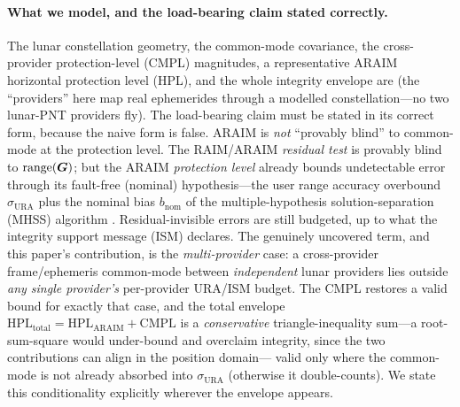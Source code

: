 \paragraph{What we model, and the load-bearing claim stated correctly.}
The lunar constellation geometry, the common-mode covariance, the cross-provider
protection-level (CMPL) magnitudes, a representative ARAIM horizontal protection level
(HPL), and the whole integrity envelope are \Modelled{} (the ``providers'' here map
real ephemerides through a modelled constellation---no two lunar-PNT providers fly).
The load-bearing claim must be stated in its correct form, because the naive form is
false. ARAIM is \emph{not} ``provably blind'' to common-mode at the protection level.
The RAIM/ARAIM \emph{residual test} is provably blind to $\operatorname{range}(\bm{G})$; but the ARAIM
\emph{protection level} already bounds undetectable error through its fault-free
(nominal) hypothesis---the user range accuracy overbound $\sigma_{\mathrm{URA}}$ plus
the nominal bias $b_{\mathrm{nom}}$ of the multiple-hypothesis solution-separation
(MHSS) algorithm \citep{blanch2015,wgc2016araim}. Residual-invisible errors are still
budgeted, up to what the integrity support message (ISM) declares. The genuinely
uncovered term, and this paper's contribution, is the \emph{multi-provider} case: a
cross-provider frame/ephemeris common-mode between \emph{independent} lunar providers
lies outside \emph{any single provider's} per-provider URA/ISM budget. The CMPL
restores a valid bound for exactly that case, and the total envelope
$\mathrm{HPL}_{\mathrm{total}}=\mathrm{HPL}_{\mathrm{ARAIM}}+\mathrm{CMPL}$ is a
\emph{conservative} triangle-inequality sum---a root-sum-square would under-bound and
overclaim integrity, since the two contributions can align in the position domain---%
valid only where the common-mode is not already absorbed into $\sigma_{\mathrm{URA}}$
(otherwise it double-counts). We state this conditionality explicitly wherever the
envelope appears.

